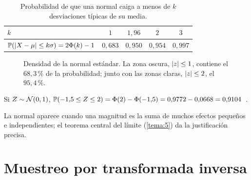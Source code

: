 \begin{table}[h]
\centering\small
\caption{Probabilidad de que una normal caiga a menos de $k$ desviaciones típicas de su media.}\label{tab:normal}
\begin{tabular}{@{}lcccc@{}}
\toprule
$k$ & $1$ & $1{,}96$ & $2$ & $3$ \\
\midrule
$\mathbb{P}(\lvert X-\mu\rvert\le k\sigma)=2\Phi(k)-1$ & $0{,}683$ & $0{,}950$ & $0{,}954$ & $0{,}997$ \\
\bottomrule
\end{tabular}
\end{table}

\begin{figure}[h]
\centering
{}
\caption{Densidad de la normal estándar. La zona oscura, $\lvert z\rvert\le 1$, contiene el $68{,}3\,\%$ de la probabilidad; junto con las zonas claras, $\lvert z\rvert\le 2$, el $95{,}4\,\%$.}
\label{fig:normal}
\end{figure}

\begin{ejemplo}\label{ej:normal}
Si $Z\sim\mathcal{N}(0,1)$, $\mathbb{P}(-1{,}5\le Z\le 2)=\Phi(2)-\Phi(-1{,}5)=0{,}9772-0{,}0668=0{,}9104$~\cite[clase~5c]{mit1805}.
\end{ejemplo}

La normal aparece cuando una magnitud es la suma de muchos efectos pequeños e independientes; el teorema central del límite (\cref{tema:5}) da la justificación precisa.

\section{Muestreo por transformada inversa}

